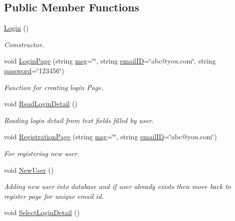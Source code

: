 \subsection*{Public Member Functions}
\begin{DoxyCompactItemize}
\item 
\hyperlink{classLogin_a4847f3e07e43b540d3339392346f87ff}{Login} ()
\begin{DoxyCompactList}\small\item\em Comstructor. \end{DoxyCompactList}\item 
void \hyperlink{classLogin_a97d84b3e5739041149d87774cb239fc6}{Login\-Page} (string \hyperlink{classInputDetail_a1abb16cd695678c3fa05e3c812823fee}{msg}=\char`\"{}\char`\"{}, string \hyperlink{classLogin_abea56d6d6403f1e627294f222dd77310}{email\-I\-D}=\char`\"{}abc@you.\-com\char`\"{}, string \hyperlink{classLogin_a39f7fd03b2b27c927c657ee73e7fcbbc}{password}=\char`\"{}123456\char`\"{})
\begin{DoxyCompactList}\small\item\em Function for creating login Page. \end{DoxyCompactList}\item 
void \hyperlink{classLogin_ab5bc65de431f277f15a3b423ad915808}{Read\-Login\-Detail} ()
\begin{DoxyCompactList}\small\item\em Reading login detail from text fields filled by user. \end{DoxyCompactList}\item 
void \hyperlink{classLogin_a3f4e5e4087c007e8e605849778881b39}{Registration\-Page} (string \hyperlink{classInputDetail_a1abb16cd695678c3fa05e3c812823fee}{msg}=\char`\"{}\char`\"{}, string \hyperlink{classLogin_abea56d6d6403f1e627294f222dd77310}{email\-I\-D}=\char`\"{}abc@you.\-com\char`\"{})
\begin{DoxyCompactList}\small\item\em For registering new user. \end{DoxyCompactList}\item 
void \hyperlink{classLogin_ae4f139afcb706f09b337befd123d5e18}{New\-User} ()
\begin{DoxyCompactList}\small\item\em Adding new user into database and if user already exists then move back to register page for unique email id. \end{DoxyCompactList}\item 
void \hyperlink{classLogin_ad127628ca09987d733477f90b828ad1e}{Select\-Login\-Detail} ()

\end{DoxyCompactItemize}
